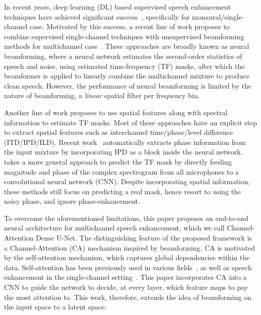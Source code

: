 \documentclass{article}
\begin{document}
In recent years, deep learning (DL) based supervised speech enhancement techniques have achieved significant success~\cite{wang2018supervised}, specifically for monaural/single-channel case. Motivated by this success, a recent line of work proposes to combine supervised single-channel techniques with unsupervised beamforming methods for multichannel case~\cite{erdogan, heymann2016neural}. These approaches are broadly known as neural beamforming, where a neural network estimates the second-order statistics of speech and noise, using estimated time-frequency (TF) masks, after which the beamformer is applied to linearly combine the multichannel mixture to produce clean speech. However, the performance of neural beamforming is limited by the nature of beamforming, a \textit{linear} spatial filter per frequency bin.

Another line of work \cite{wang2018combining, wang2018multi} proposes to use spatial features along with spectral information to estimate TF masks. Most of these approaches have an explicit step to extract spatial features such as interchannel time/phase/level difference (ITD/IPD/ILD). Recent work~\cite{endtoend} automatically extracts phase information from the input mixture by incorporating IPD as a block inside the neural network. \cite{maskchak} takes a more general approach to predict the TF mask by directly feeding magnitude and phase of the complex spectrogram from all microphones to a convolutional neural network (CNN). Despite incorporating spatial information, these methods still focus on predicting a real mask, hence resort to using the noisy phase, and ignore phase-enhancement.












To overcome the aforementioned limitations, this paper proposes an end-to-end neural architecture for multichannel speech enhancement, which we call Channel-Attention Dense U-Net. The distinguishing feature of the proposed framework is a Channel-Attention (CA) mechanism inspired by beamforming. CA is motivated by the self-attention mechanism, which captures global dependencies within the data. Self-attention has been previously used in various fields~\cite{bahdanau2014neural, parikhetal2016decomposable,saGANs}, as well as speech enhancement in the single-channel setting~\cite{attentionunet}. This paper incorporates CA into a CNN to guide the network to decide, at every layer, which feature maps to pay the most attention to. This work, therefore, extends the idea of beamforming on the input space to a latent space. 
\end{document}

